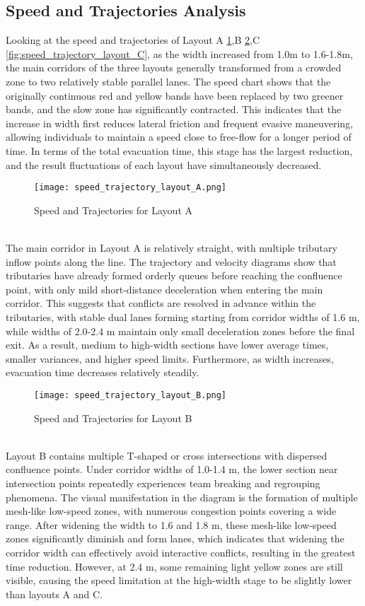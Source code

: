 \subsection{Speed and Trajectories Analysis}
Looking at the speed and trajectories of Layout A \ref{fig:speed_trajectory_layout_A},B \ref{fig:speed_trajectory_layout_B},C \ref{fig:speed_trajectory_layout_C}, as the width increased from 1.0m to 1.6-1.8m, the main corridors of the three layouts generally transformed from a crowded zone to two relatively stable parallel lanes. The speed chart shows that the originally continuous red and yellow bands have been replaced by two greener bands, and the slow zone has significantly contracted. This indicates that the increase in width first reduces lateral friction and frequent evasive maneuvering, allowing individuals to maintain a speed close to free-flow for a longer period of time. In terms of the total evacuation time, this stage has the largest reduction, and the result fluctuations of each layout have simultaneously decreased.
\begin{figure}[h]
    \centering
    \texttt{[image: speed\_trajectory\_layout\_A.png]}
    \caption{Speed and Trajectories for Layout A}
    \label{fig:speed_trajectory_layout_A}
\end{figure}
\\The main corridor in Layout A is relatively straight, with multiple tributary inflow points along the line. The trajectory and velocity diagrams show that tributaries have already formed orderly queues before reaching the confluence point, with only mild short-distance deceleration when entering the main corridor. This suggests that conflicts are resolved in advance within the tributaries, with stable dual lanes forming starting from corridor widths of 1.6 m, while widths of 2.0-2.4 m maintain only small deceleration zones before the final exit. As a result, medium to high-width sections have lower average times, smaller variances, and higher speed limits. Furthermore, as width increases, evacuation time decreases relatively steadily.
\begin{figure}[h]
    \centering
    \texttt{[image: speed\_trajectory\_layout\_B.png]}
    \caption{Speed and Trajectories for Layout B}
    \label{fig:speed_trajectory_layout_B}
\end{figure}
\\Layout B contains multiple T-shaped or cross intersections with dispersed confluence points. Under corridor widths of 1.0-1.4 m, the lower section near intersection points repeatedly experiences team breaking and regrouping phenomena. The visual manifestation in the diagram is the formation of multiple mesh-like low-speed zones, with numerous congestion points covering a wide range. After widening the width to 1.6 and 1.8 m, these mesh-like low-speed zones significantly diminish and form lanes, which indicates that widening the corridor width can effectively avoid interactive conflicts, resulting in the greatest time reduction. However, at 2.4 m, some remaining light yellow zones are still visible, causing the speed limitation at the high-width stage to be slightly lower than layouts A and C.

